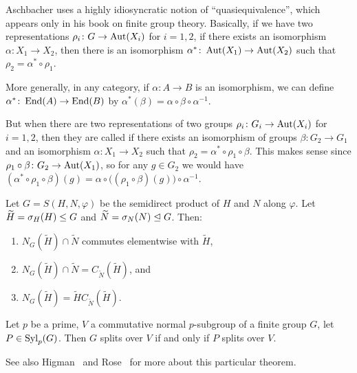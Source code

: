 \begin{thm-remark}
Aschbacher uses a highly idiosyncratic notion of ``quasiequivalence'',
which appears only in his book on finite group theory.
Basically, if we have two representations $\rho_{i}\colon G\to\operatorname{Aut}(X_{i})$
for $i=1,2$, if there exists an isomorphism $\alpha\colon X_{1}\to X_{2}$,
then there is an isomorphism $\alpha^{*}\colon\operatorname{Aut}(X_{1})\to\operatorname{Aut}(X_{2})$
such that $\rho_{2}=\alpha^{*}\circ\rho_{1}$. 

More generally, in any category, if $\alpha\colon A\to B$ is an
isomorphism, we can define $\alpha^{*}\colon\operatorname{End}(A)\to\operatorname{End}(B)$ by
$\alpha^{*}(\beta)=\alpha\circ\beta\circ\alpha^{-1}$.

But when there are two representations of two groups
$\rho_{i}\colon G_{i}\to\operatorname{Aut}(X_{i})$ for $i=1,2$, then they are called
 if there exists an isomorphism of groups
$\beta\colon G_{2}\to G_{1}$ and an isomorphism $\alpha\colon X_{1}\to X_{2}$
such that $\rho_{2}=\alpha^{*}\circ\rho_{1}\circ\beta$.
This makes sense since $\rho_{1}\circ\beta\colon G_{2}\to\operatorname{Aut}(X_{1})$,
so for any $g\in G_{2}$ we would have
$(\alpha^{*}\circ\rho_{1}\circ\beta)(g)=\alpha\circ\bigl((\rho_{1}\circ\beta)(g)\bigr)\circ\alpha^{-1}$.
\end{thm-remark}


\begin{theorem}
Let $G=S(H,N,\varphi)$ be the semidirect product of $H$ and $N$ along $\varphi$.
Let $\widetilde{H}=\sigma_{H}(H)\leq G$ and
$\widetilde{N}=\sigma_{N}(N)\trianglelefteq G$.
Then:
\begin{enumerate}
\item $N_{G}(\widetilde{H})\cap\widetilde{N}$ commutes elementwise with $\widetilde{H}$,
\item $N_{G}(\widetilde{H})\cap\widetilde{N} = C_{\widetilde{N}}(\widetilde{H})$,
and
\item $N_{G}(\widetilde{H}) = \widetilde{H}C_{\widetilde{N}}(\widetilde{H})$.
\end{enumerate}
\end{theorem}

\begin{theorem}
Let $p$ be a prime, $V$ a commutative normal $p$-subgroup of a finite
group $G$, let $P\in\mathop{\rm Syl}\nolimits_{p}(G)$. 
Then $G$ splits over $V$ if and only if $P$ splits over $V$.
\end{theorem}

\begin{thm-remark}
See also Higman~\cite{higman1954remarks} and Rose~\cite{rose1966} for
more about this particular theorem. 
\end{thm-remark}